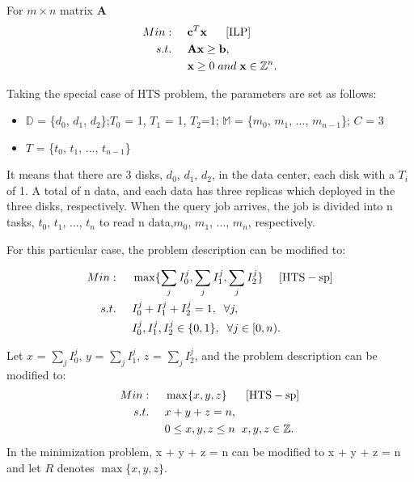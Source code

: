 \documentclass[conference]{IEEEtran}
\begin{document}
For $m\times n$ matrix \textbf{A}
\begin{align}
Min:&\;\;\;\;\;\textbf{c}^T\textbf{x}\;\;\;\;\;\;[\rm{ILP}]\label{ILP}\\
s.t. 
&\;\;\;\;\;\textbf{A}\textbf{x}\geq \textbf{b},\nonumber\\
&\;\;\;\;\;\textbf{x} \geq0\;and\;\textbf{x} \in \mathbb{Z}^n.\nonumber
\end{align}

Taking the special case of HTS problem, the parameters are set as follows:
\begin{itemize}
	\item $\mathbb{D}$ = \{$d_0$, $d_1$, $d_2$\};$T_0$ = 1, $T_1$ = 1, $T_2$=1; $\mathbb{M}$ = \{$m_0$, $m_1$, ..., $m_{n-1}$\}; $C$ = 3
	\item $T$ = \{$t_0$, $t_1$, ..., $t_{n-1}$\}
\end{itemize}

It means that there are 3 disks, $d_0$, $d_1$, $d_2$, in the data center, each disk with a $T_i$ of 1. A total of n data, and each data has three replicas which deployed in the three disks, respectively. When the query job arrives, the job is divided into n tasks, $t_0$, $t_1$, ..., $t_n$ to read n data,$m_0$, $m_1$, ..., $m_n$, respectively.

For this particular case, the problem description can be modified to:

\begin{align}
Min:&\;\;\;\;\;\max\{\sum_{j}I_0^j, \sum_{j}I_1^j, \sum_{j}I_2^j\}\;\;\;\;\;[\rm{HTS-sp}]\\
s.t. 
&\;\;\;\;\;I_0^j + I_1^j +I_2^j= 1,\;\;\forall j,\nonumber\\
&\;\;\;\;\;I_0^j, I_1^j, I_2^j\in\{0,1\},\;\;\forall j \in[0,n).\nonumber
\end{align}

Let  $x$ = $\sum_{j}I_0^j$, $y$ = $\sum_{j}I_1^j$, $z$ = $\sum_{j}I_2^j$, and the problem description can be modified to:
\begin{align}
Min:&\;\;\;\;\;\max\{x,y,z\}\;\;\;\;\;\;[\rm{HTS-sp}]\\
s.t. 
&\;\;\;\;\;x + y + z = n,\;\label{enlarge-cons}\\
&\;\;\;\;\;0 \leq x, y, z \leq n  \;\;x, y, z\in\mathbb{Z}.\nonumber
\end{align}
In the minimization problem, x + y + z = n can be modified to x + y + z = n and let $R$ denotes $\max\{x,y,z\}$. 
\end{document}
